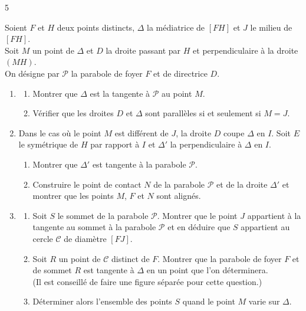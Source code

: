 \documentclass{axiobac}
\begin{document}
\begin{exercice}{5}

Soient $F$ et $H$ deux points distincts, $\Delta$ la médiatrice de $[FH]$ et $J$ le milieu de $[FH]$. \\
Soit $M$ un point de $\Delta$ et $D$ la droite passant par $H$ et perpendiculaire à la droite $(MH)$. \\
On désigne par $\mathcal{P}$ la parabole de foyer $F$ et de directrice $D$.

\begin{enumerate}
    \item
    \begin{enumerate}
        \item Montrer que $\Delta$ est la tangente à $\mathcal{P}$ au point $M$.
        \item Vérifier que les droites $D$ et $\Delta$ sont parallèles si et seulement si $M = J$.
    \end{enumerate}
    \item Dans le cas où le point $M$ est différent de $J$, la droite $D$ coupe $\Delta$ en $I$. Soit $E$ le symétrique de $H$ par rapport à $I$ et $\Delta'$ la perpendiculaire à $\Delta$ en $I$.
    \begin{enumerate}
        \item Montrer que $\Delta'$ est tangente à la parabole $\mathcal{P}$.
        \item Construire le point de contact $N$ de la parabole $\mathcal{P}$ et de la droite $\Delta'$ et montrer que les points $M$, $F$ et $N$ sont alignés.
    \end{enumerate}
    \item
    \begin{enumerate}
        \item Soit $S$ le sommet de la parabole $\mathcal{P}$. Montrer que le point $J$ appartient à la tangente au sommet à la parabole $\mathcal{P}$ et en déduire que $S$ appartient au cercle $\mathcal{C}$ de diamètre $[FJ]$.
        \item Soit $R$ un point de $\mathcal{C}$ distinct de $F$. Montrer que la parabole de foyer $F$ et de sommet $R$ est tangente à $\Delta$ en un point que l'on déterminera. \\
        (Il est conseillé de faire une figure séparée pour cette question.)
        \item Déterminer alors l'ensemble des points $S$ quand le point $M$ varie sur $\Delta$.
    \end{enumerate}
\end{enumerate}

\end{exercice}
\end{document}
